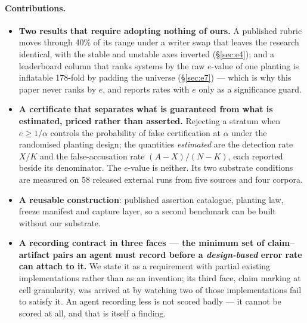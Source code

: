 \documentclass[10pt]{article}
\newcommand{\RM}[1]{{#1}}
\begin{document}
\paragraph{Contributions.}
\begin{itemize}\itemsep2pt
\item[\textbf{C1}] \textbf{Two results that require adopting nothing of ours.}
A published rubric moves through \RM{40\%} of its range under a writer swap that
leaves the research identical, with the stable and unstable axes inverted
(\S\ref{sec:e4}); and a leaderboard column that ranks systems by the raw
$e$-value of one planting is inflatable \RM{178}-fold by padding the universe
(\S\ref{sec:e7}) --- which is why this paper never ranks by $e$, and reports
rates with $e$ only as a significance guard.
\item[\textbf{C2}] \textbf{A certificate that separates what is guaranteed from
what is estimated, priced rather than asserted.} Rejecting a stratum when
$e\ge 1/\alpha$ controls the probability of false certification at $\alpha$
under the randomised planting design; the quantities \emph{estimated} are the
detection rate $X/K$ and the false-accusation rate $(A-X)/(N-K)$, each reported
beside its denominator. The $e$-value is neither. Its two substrate conditions
are measured on \RM{58} released external runs from \RM{five} sources and
\RM{four} corpora.
\item[\textbf{C3}] \textbf{A reusable construction}: published assertion
catalogue, planting law, freeze manifest and capture layer, so a second
benchmark can be built without our substrate.
\item[\textbf{C4}] \textbf{A recording contract in three faces --- the minimum
set of claim--artifact pairs an agent must record before a \emph{design-based} error rate
can attach to it.} We state it as a requirement with partial existing
implementations \cite{symposium,ara} rather than as an invention; its third face,
claim marking at cell granularity, was arrived at by watching two of those
implementations fail to satisfy it. An agent recording less is not scored badly
--- it cannot be scored at all, and that is itself a finding.
\end{itemize}
\end{document}
